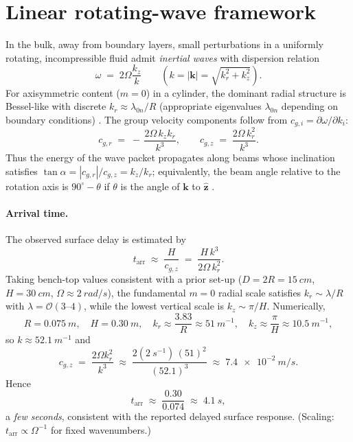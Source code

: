 \documentclass[12pt]{article}
\newcommand{\Om}{\Omega}
\newcommand{\bk}{\boldsymbol{k}}
\newcommand{\ez}{\hat{\boldsymbol{z}}}
\begin{document}
\section{Linear rotating-wave framework}
In the bulk, away from boundary layers, small perturbations in a uniformly rotating, incompressible fluid admit \emph{inertial waves} with dispersion relation \cite{Greenspan1968,Batchelor1967,Vallis2017}
\begin{equation}
\omega \;=\; 2\Om \frac{k_z}{k}
\qquad (k=|\bk|=\sqrt{k_r^2+k_z^2}).  \label{eq:disp}
\end{equation}
For axisymmetric content ($m=0$) in a cylinder, the dominant radial structure is Bessel-like with discrete $k_r\approx \lambda_{0n}/R$ (appropriate eigenvalues $\lambda_{0n}$ depending on boundary conditions) \cite{Greenspan1968}. The group velocity components follow from $c_{g,i}=\partial\omega/\partial k_i$:
\begin{equation}
c_{g,r} \;=\; -\,\frac{2\Om\,k_z k_r}{k^3}, 
\qquad
c_{g,z} \;=\; \frac{2\Om\,k_r^2}{k^3}. \label{eq:cg}
\end{equation}
Thus the energy of the wave packet propagates along beams whose inclination satisfies $\tan\alpha=|c_{g,r}|/c_{g,z}=k_z/k_r$; equivalently, the beam angle relative to the rotation axis is $90^\circ-\theta$ if $\theta$ is the angle of $\bk$ to $\ez$ \cite{Greenspan1968}.

\paragraph{Arrival time.}
The observed surface delay is estimated by
\begin{equation}
t_{\mathrm{arr}} \;\approx\; \frac{H}{c_{g,z}} 
\;=\; \frac{H\,k^3}{2\Om\,k_r^2}. \label{eq:tarr}
\end{equation}
Taking bench-top values consistent with a prior set-up ($D=2R=\SI{15}{cm}$, $H=\SI{30}{cm}$, $\Om\approx \SI{2}{rad/s}$), the fundamental $m=0$ radial scale satisfies $k_r \sim \lambda/R$ with $\lambda=\mathcal{O}(3\text{--}4)$, while the lowest vertical scale is $k_z\sim \pi/H$. Numerically,
\[
R=\SI{0.075}{m},\quad H=\SI{0.30}{m},\quad
k_r\approx \frac{3.83}{R}\approx \SI{51}{m^{-1}},\quad
k_z\approx \frac{\pi}{H}\approx \SI{10.5}{m^{-1}},
\]
so $k\approx \SI{52.1}{m^{-1}}$ and
\[
c_{g,z}\;=\;\frac{2\Om k_r^2}{k^3}\;\approx\;
\frac{2(\SI{2}{s^{-1}})\,(51)^2}{(52.1)^3}
\;\approx\; \SI{7.4e-2}{m/s}.
\]
Hence
\[
t_{\mathrm{arr}}\;\approx\;\frac{0.30}{0.074}\;\approx\;\SI{4.1}{s},
\]
a \emph{few seconds}, consistent with the reported delayed surface response. (Scaling: $t_{\mathrm{arr}}\propto \Om^{-1}$ for fixed wavenumbers.)
\end{document}
